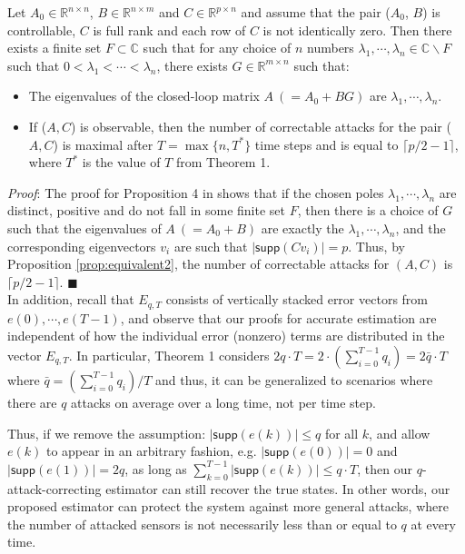 \documentclass[../../thesis.tex]{subfiles}
\begin{document}
\begin{proposition}\label{prop:maximum} 
Let $A_0 \in \mathbb{R}^{n \times n}$, $B \in \mathbb{R}^{n \times m}$ and $C \in \mathbb{R}^{p \times n}$ and assume that the pair ($A_0$, $B$) is controllable, $C$ is full rank and each row of $C$ is not identically zero. Then there exists a finite set $F \subset \mathbb{C}$ such that for any choice of $n$ numbers $\lambda_1, \cdots, \lambda_n \in \mathbb{C} \backslash F$ such that $0<\lambda_1< \cdots < \lambda_n$, there exists $G \in \mathbb{R}^{m \times n}$ such that:

\begin{itemize}
\item
The eigenvalues of the closed-loop matrix $A~(= A_0+BG)$ are $\lambda_1, \cdots, \lambda_n$.
\item
If ($A, C$) is observable, then the number of correctable attacks for the pair ($A, C$) is maximal after $T= \max\{n, T^*\}$ time steps and is equal to $\lceil p/2-1 \rceil$, where $T^*$ is the value of $T$ from Theorem 1. 
\end{itemize}
\end{proposition}

\textit{Proof}:
The proof for Proposition 4 in \cite{Fawzi:2014} shows that if the chosen poles $\lambda_1, \cdots, \lambda_n$ are distinct, positive and do not fall in some finite set $F$, then there is a choice of $G$ such that the eigenvalues of $A~(=A_0+B)$ are exactly the $\lambda_1, \cdots, \lambda_n$, and the corresponding eigenvectors $v_i$ are such that $\lvert \textsf{supp} (C v_i) \rvert = p$. Thus, by Proposition \ref{prop:equivalent2}, the number of correctable attacks for $(A,C)$ is $\lceil p/2-1 \rceil$. \hfill$\blacksquare$
\\

In addition, recall that $E_{q,T}$ consists of vertically stacked error vectors from $e(0), \cdots, e(T-1)$, and observe that our proofs for accurate estimation are independent of how the individual error (nonzero) terms are distributed in the vector $E_{q,T}$. In particular, %
Theorem 1 considers $2 q \cdot T = 2 \cdot (\sum_{i=0}^{T-1} q_i) = 2 \bar q \cdot T$ where $\bar q = (\sum_{i=0}^{T-1} q_i ) /T$ and thus, it can be generalized to scenarios where there are $q$ attacks on average over a long time, not per time step.

Thus, if we remove the assumption: $\lvert \textsf{supp} (e(k)) \rvert \le q$ for all $k$, and allow $e(k)$ to appear in an arbitrary fashion, e.g. $\lvert \textsf{supp} (e(0)) \rvert = 0$ and $\lvert \textsf{supp} (e(1)) \rvert = 2q$, as long as $\sum_{k=0}^{T-1} \lvert \textsf{supp} (e(k)) \rvert \leq q\cdot T$, then our $q$-attack-correcting estimator can still recover the true states. In other words, our proposed estimator can protect the system against more general attacks, where the number of attacked sensors is not necessarily less than or equal to $q$ at every time.
\end{document}
